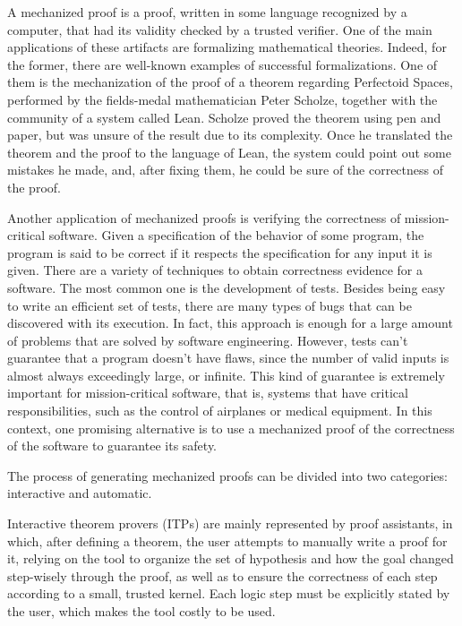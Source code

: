 A mechanized proof is a proof, written in some language recognized by a computer, that had its validity checked by a trusted verifier. One of the main applications of these artifacts are formalizing mathematical theories. Indeed, for the former, there are well-known examples of successful formalizations. One of them is the mechanization of the proof of a theorem regarding Perfectoid Spaces\cite{scholze}, performed by the fields-medal mathematician Peter Scholze, together with the community of a system called Lean\cite{lean}. Scholze proved the theorem using pen and paper, but was unsure of the result due to its complexity. Once he translated the theorem and the proof to the language of Lean, the system could point out some mistakes he made, and, after fixing them, he could be sure of the correctness of the proof.

Another application of mechanized proofs is verifying the correctness of mission-critical software. Given a specification of the behavior of some program, the program is said to be correct if it respects the specification for any input it is given. There are a variety of techniques to obtain correctness evidence for a software. The most common one is the development of tests. Besides being easy to write an efficient set of tests, there are many types of bugs that can be discovered with its execution. In fact, this approach is enough for a large amount of problems that are solved by software engineering. However, tests can’t guarantee that a program doesn’t have flaws, since the number of valid inputs is almost always exceedingly large, or infinite. This kind of guarantee is extremely important for mission-critical software, that is, systems that have critical responsibilities, such as the control of airplanes or medical equipment. In this context, one promising alternative is to use a mechanized proof of the correctness of the software to guarantee its safety.

The process of generating mechanized proofs can be divided into
two categories: interactive and automatic.

Interactive theorem provers (ITPs) are mainly represented by proof assistants, in which, after defining
a theorem, the user attempts to manually write a proof for it,
relying on the tool to organize the set of hypothesis and
how the goal changed step-wisely through the proof, as well as to ensure the
correctness of each step according to a small, trusted kernel.
%
Each logic step must be explicitly stated by the user, which makes the tool
costly to be used.

